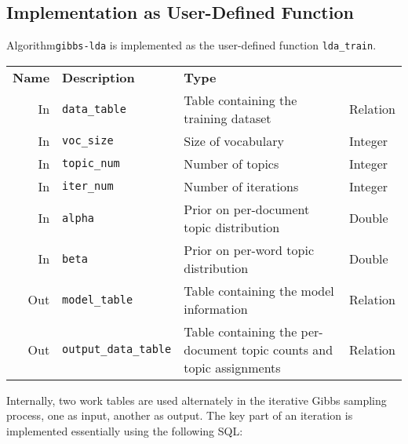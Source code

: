 \subsection{Implementation as User-Defined Function}

Algorithm\texttt{gibbs-lda} is implemented as the user-defined function \texttt{lda\_train}.

\begin{center}
    \begin{tabularx}{\textwidth}{rlXl}
        \toprule%
        \textbf{Name} & \textbf{Description} & \textbf{Type}
        \\\otoprule

        In &
        \texttt{data\_table} &
        Table containing the training dataset &
        Relation
        \\\midrule

       In &
        \texttt{voc\_size} &
        Size of vocabulary &
        Integer
        \\\midrule

        In &
        \texttt{topic\_num} &
        Number of topics &
        Integer
        \\\midrule

        In &
        \texttt{iter\_num} &
        Number of iterations &
        Integer
        \\\midrule
    
        In &
        \texttt{alpha} &
        Prior on per-document topic distribution &
        Double
        \\\midrule

        In &
        \texttt{beta} &
        Prior on per-word topic distribution &
        Double
        \\\midrule

        Out &
        \texttt{model\_table} &
        Table containing the model information &
        Relation
        \\\midrule

        Out &
        \texttt{output\_data\_table} &
        Table containing the per-document topic counts and topic assignments &
        Relation
        \\\bottomrule
     \end{tabularx}
\end{center}

Internally, two work tables are used alternately in the iterative Gibbs sampling process, one as input, another as output. The key part of an iteration is implemented essentially using the following SQL:

